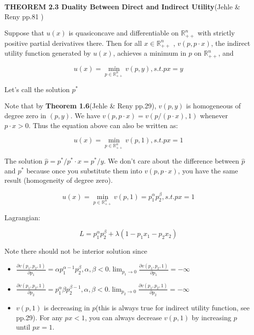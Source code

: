 \documentclass{article}
\newcommand{\R}{\mathbb{R}}
\begin{document}
\begin{mdframed}[backgroundcolor=blue!20,linecolor=white]
\textbf{THEOREM 2.3 Duality Between Direct and Indirect Utility}(Jehle \& Reny pp.81 )


Suppose that $u(x)$ is quasiconcave and differentiable on $\R^n_{++}$ with strictly positive partial derivatives there. Then for all $x \in \R^n_{++}$ , $v(p, p \cdot x)$, the indirect utility function generated
by $u(x)$, achieves a minimum in $p$ on $\R^n_{++}$, and

$$u(x) = \min_{p \in \R^n_{++}}  v(p,y), s.t. px=y$$

Let's call the solution $p^*$

Note that by \textbf{Theorem 1.6}(Jehle \& Reny pp.29), $v(p, y)$ is homogeneous of degree zero in $(p, y)$. We have $v(p, p \cdot x) = v(p/(p \cdot x), 1)$ whenever $p \cdot x > 0$. Thus the equation above can also be written as:

$$u(x) = \min_{p \in \R^n_{++}}  v(p,1), s.t. px=1$$

The solution $\hat{p} = p^* / p^* \cdot x = p^* / y$. We don't care about the difference between $\hat{p}$ and $p^*$ because once you substitute them into $v(p,p\cdot x)$, you have the same result (homogeneity of degree zero).
\end{mdframed}

$$u(x) = \min_{p \in \R^n_{++}}  v(p, 1) =
p_1^\alpha p_2^\beta, s.t. px=1$$

Lagrangian:

$$L = p_1^\alpha p_2^\beta + \lambda (1- p_1x_1 - p_2x_2)$$

Note there should not be interior solution since

\begin{itemize}
\item $\frac{\partial v(p_1,p_2,1)}{\partial p_1} = \alpha p_1^{\alpha -1}p_2^\beta, \alpha, \beta < 0. \lim_{p_1 \to 0} \frac{\partial v(p_1,p_2,1)}{\partial p_1} = - \infty$

\item $\frac{\partial v(p_1,p_2,1)}{\partial p_2} = p_1^{\alpha} \beta p_2^{\beta - 1}, \alpha, \beta < 0. \lim_{p_2 \to 0} \frac{\partial v(p_1,p_2,1)}{\partial p_2} = - \infty$

\item $v(p,1)$ is decreasing in $p$(this is always true for indirect utility function, see pp.29). For any $px<1$, you can always decrease $v(p, 1)$ by increasing $p$ until $px = 1$.
\end{itemize}
\end{document}
